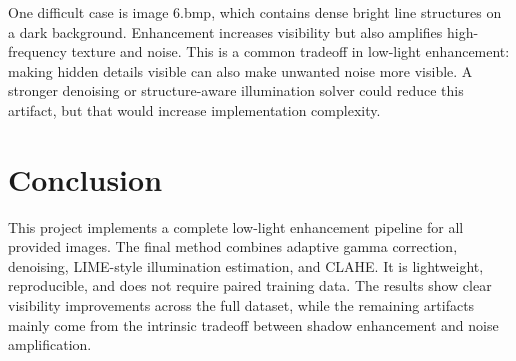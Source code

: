 \documentclass[11pt,a4paper]{article}
\begin{document}
One difficult case is image 6.bmp, which contains dense bright line structures on a dark background. Enhancement increases visibility but also amplifies high-frequency texture and noise. This is a common tradeoff in low-light enhancement: making hidden details visible can also make unwanted noise more visible. A stronger denoising or structure-aware illumination solver could reduce this artifact, but that would increase implementation complexity.

\section{Conclusion}

This project implements a complete low-light enhancement pipeline for all provided images. The final method combines adaptive gamma correction, denoising, LIME-style illumination estimation, and CLAHE. It is lightweight, reproducible, and does not require paired training data. The results show clear visibility improvements across the full dataset, while the remaining artifacts mainly come from the intrinsic tradeoff between shadow enhancement and noise amplification.



\end{document}
